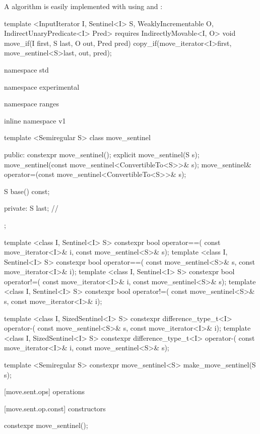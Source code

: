 \pnum
\enterexample A  algorithm is easily implemented with
 using  and :

\begin{codeblock}
template <InputIterator I, Sentinel<I> S, WeaklyIncrementable O,
          IndirectUnaryPredicate<I> Pred>
  requires IndirectlyMovable<I, O>
void move_if(I first, S last, O out, Pred pred)
{
  copy_if(move_iterator<I>{first}, move_sentinel<S>{last}, out, pred);
}
\end{codeblock}

\exitexample

%
\begin{codeblock}
namespace std { namespace experimental { namespace ranges { inline namespace v1 {
  template <Semiregular S>
  class move_sentinel {
  public:
    constexpr move_sentinel();
    explicit move_sentinel(S s);
    move_sentinel(const move_sentinel<ConvertibleTo<S>>& s);
    move_sentinel& operator=(const move_sentinel<ConvertibleTo<S>>& s);

    S base() const;

  private:
    S last; // \expos
  };

  template <class I, Sentinel<I> S>
    constexpr bool operator==(
      const move_iterator<I>& i, const move_sentinel<S>& s);
  template <class I, Sentinel<I> S>
    constexpr bool operator==(
      const move_sentinel<S>& s, const move_iterator<I>& i);
  template <class I, Sentinel<I> S>
    constexpr bool operator!=(
      const move_iterator<I>& i, const move_sentinel<S>& s);
  template <class I, Sentinel<I> S>
    constexpr bool operator!=(
      const move_sentinel<S>& s, const move_iterator<I>& i);

  template <class I, SizedSentinel<I> S>
    constexpr difference_type_t<I> operator-(
      const move_sentinel<S>& s, const move_iterator<I>& i);
  template <class I, SizedSentinel<I> S>
    constexpr difference_type_t<I> operator-(
      const move_iterator<I>& i, const move_sentinel<S>& s);

  template <Semiregular S>
    constexpr move_sentinel<S> make_move_sentinel(S s);
}}}}
\end{codeblock}

[move.sent.ops]{ operations}

[move.sent.op.const]{ constructors}

%
\begin{itemdecl}
constexpr move_sentinel();
\end{itemdecl}

